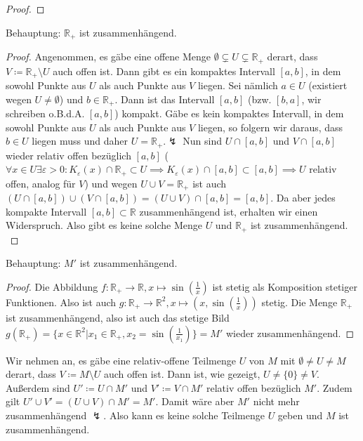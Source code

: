 \documentclass{article}
\theoremstyle{definition}
\newcommand{\R}{\mathbb{R}}
\renewcommand{\epsilon}{\varepsilon}
\begin{document}
\begin{enumerate}[(a)]
\begin{proof}
	\end{proof}
	Behauptung: $\R_+$ ist zusammenhängend.
	\begin{proof}
		Angenommen, es gäbe eine offene Menge $\emptyset \subsetneq U\subsetneq \R_+$ derart, dass $V \coloneqq \R_+\setminus U$ auch offen ist. Dann gibt es ein kompaktes Intervall $[a,b]$, in dem sowohl Punkte aus $U$ als auch Punkte aus $V$ liegen. Sei nämlich $a \in U$ (existiert wegen $U\neq \emptyset$) und $b\in \R_+$. Dann ist das Intervall $[a,b]$ (bzw. $[b,a]$, wir schreiben o.B.d.A. $[a,b]$) kompakt. Gäbe es kein kompaktes Intervall, in dem sowohl Punkte aus $U$ als auch Punkte aus $V$ liegen, so folgern wir daraus, dass $b \in U$ liegen muss und daher $U = \R_+.\lightning$ Nun sind $U \cap [a,b]$ und $V \cap [a,b]$ wieder relativ offen bezüglich $[a,b]$ ($\forall x \in U\exists \epsilon>0: K_\epsilon(x) \cap \R_+ \subset U \implies K_\epsilon(x)\cap [a,b] \subset [a,b] \implies U$ relativ offen, analog für $V$) und wegen $U \cup V = \R_+$ ist auch $(U\cap [a,b]) \cup (V \cap [a,b]) = (U \cup V)\cap [a,b] = [a,b]$. Da aber jedes kompakte Intervall $[a,b]\subset \R$ zusammenhängend ist, erhalten wir einen Widerspruch. Also gibt es keine solche Menge $U$ und $\R_+$ ist zusammenhängend.\\
	\end{proof}
	Behauptung: $M'$ ist zusammenhängend.
	\begin{proof}
		Die Abbildung $f: \R_+ \to \R, x \mapsto \sin\left(\frac{1}{x}\right)$ ist stetig als Komposition stetiger Funktionen. Also ist auch $g: \R_+ \to \R^2, x \mapsto (x, \sin\left(\frac{1}{x}\right))$ stetig. Die Menge $\R_+$ ist zusammenhängend, also ist auch das stetige Bild $g(\R_+) = \{x \in \R^2| x_1\in \R_+, x_2 = \sin\left(\frac{1}{x_1}\right)\} = M'$ wieder zusammenhängend.
	\end{proof}
	Wir nehmen an, es gäbe eine relativ-offene Teilmenge $U$ von $M$ mit $\emptyset \neq U \neq M$ derart, dass $V \coloneqq M\setminus U$ auch offen ist. Dann ist, wie gezeigt, $U \neq \{0\} \neq V$. Außerdem sind $U' \coloneqq U \cap M'$ und $V' \coloneqq V \cap M'$ relativ offen bezüglich $M'$. Zudem gilt $U' \cup V' = (U \cup V) \cap M' = M'$. Damit wäre aber $M'$ nicht mehr zusammenhängend $\lightning$. Also kann es keine solche Teilmenge $U$ geben und $M$ ist zusammenhängend.
\end{enumerate}
\end{document}
